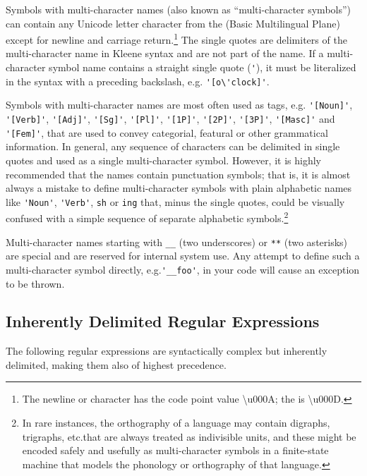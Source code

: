 \vspace{.5cm}

\noindent
Symbols with multi-character names (also known as ``multi-character symbols'') can contain any
Unicode letter character from the  (Basic Multilingual Plane) except for newline and
carriage return.\footnote{The newline or  character has the code
point value \textbackslash{}u000A; the  is \textbackslash{}u000D.}  The
single quotes are delimiters of the multi-character 
name in Kleene syntax and are not part of the name.  If a
multi-character symbol name contains a straight single quote
(\verb!'!), it must be literalized in the syntax with a preceding backslash, e.g.\@
\verb!'[o\'clock]'!.

Symbols with multi-character names are most often used as tags, e.g.\@
\verb!'[Noun]'!, \verb!'[Verb]'!, \verb!'[Adj]'!, \verb!'[Sg]'!,
\verb!'[Pl]'!, \verb!'[1P]'!, \verb!'[2P]'!, \verb!'[3P]'!,
\verb!'[Masc]'! and \verb!'[Fem]'!, that are used to convey categorial,
featural or other grammatical information.  In general, any sequence of
 characters can be delimited in single quotes and used as a
single multi-character symbol.  However, it is highly recommended that
the names contain punctuation symbols; that is, it is almost always a
mistake to define multi-character symbols with plain alphabetic names
like \verb!'Noun'!, \verb!'Verb'!, \verb'sh' or \verb'ing' that, 
minus the single quotes, could be visually confused with a simple
sequence of separate alphabetic symbols.\footnote{In rare instances, the
orthography of a language may contain digraphs, trigraphs, etc.\@ that
are always treated as indivisible units, and these might be encoded
safely and usefully as multi-character symbols in a finite-state machine
that models the phonology or orthography of that language.}

Multi-character names starting with \verb!__! (two underscores) or
\verb!**! (two asterisks) are special and are reserved for internal
system use.  Any attempt to define such a multi-character symbol
directly, e.g.\@ \verb!'__foo'!, in your code will cause an exception to be
thrown.

\subsection{Inherently Delimited Regular Expressions}

The following regular expressions are syntactically complex but
inherently delimited, making them also of highest precedence.

